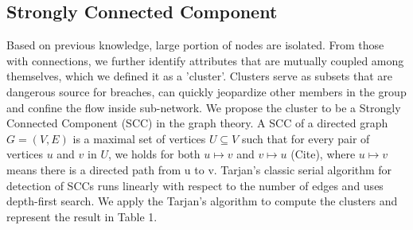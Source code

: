 \documentclass[letterpaper, 10 pt, conference]{ieeeconf}  %
\begin{document}



\subsection{Strongly Connected Component}
Based on previous knowledge, large portion of nodes are isolated. From those with connections, we further identify attributes that are mutually coupled among themselves, which we defined it as a 'cluster'. Clusters serve as subsets that are dangerous source for breaches, can quickly jeopardize other members in the group and confine the flow inside sub-network. 
We propose the cluster to be a Strongly Connected Component (SCC) in the graph theory. A SCC of a directed graph $G = (V, E)$ is a maximal set of vertices $U \subseteq V$ such that for every pair of vertices $u$ and $v$ in $U$, we holds for both $u \mapsto v$ and $v \mapsto u$ (Cite), where $u \mapsto v$ means there is a directed path from u to v. Tarjan's classic serial algorithm for detection of SCCs runs linearly with respect to the number of edges and uses depth-first search. We apply the Tarjan's algorithm to compute the clusters and represent the result in Table 1. 
\end{document}
